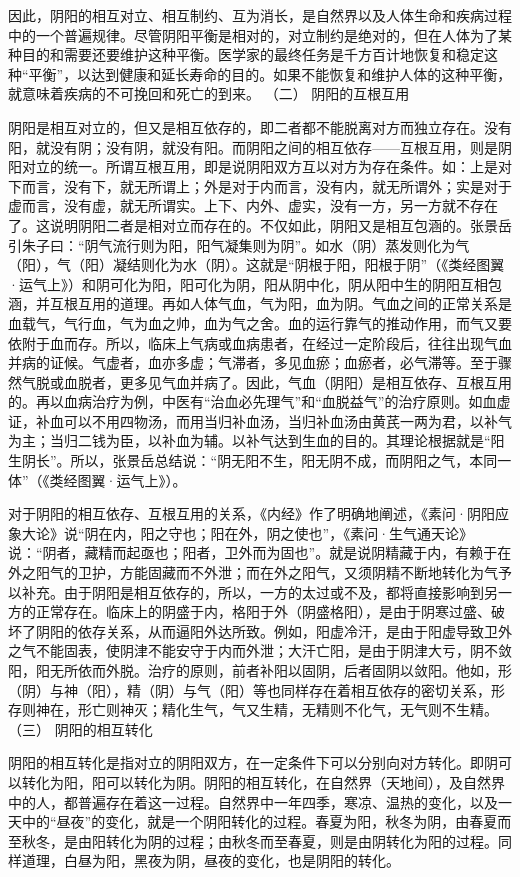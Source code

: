 \documentclass[a4paper,12pt,UTF8,twoside]{ctexbook}
\begin{document}
因此，阴阳的相互对立、相互制约、互为消长，是自然界以及人体生命和疾病过程中的一个普遍规律。尽管阴阳平衡是相对的，对立制约是绝对的，但在人体为了某种目的和需要还要维护这种平衡。医学家的最终任务是千方百计地恢复和稳定这种“平衡”，以达到健康和延长寿命的目的。如果不能恢复和维护人体的这种平衡，就意味着疾病的不可挽回和死亡的到来。
（二） 阴阳的互根互用

阴阳是相互对立的，但又是相互依存的，即二者都不能脱离对方而独立存在。没有阳，就没有阴；没有阴，就没有阳。而阴阳之间的相互依存——互根互用，则是阴阳对立的统一。所谓互根互用，即是说阴阳双方互以对方为存在条件。如：上是对下而言，没有下，就无所谓上；外是对于内而言，没有内，就无所谓外；实是对于虚而言，没有虚，就无所谓实。上下、内外、虚实，没有一方，另一方就不存在了。这说明阴阳二者是相对立而存在的。不仅如此，阴阳又是相互包涵的。张景岳引朱子曰：“阴气流行则为阳，阳气凝集则为阴”。如水（阴）蒸发则化为气（阳），气（阳）凝结则化为水（阴）。这就是“阴根于阳，阳根于阴”（《类经图翼·运气上》）和阴可化为阳，阳可化为阴，阳从阴中化，阴从阳中生的阴阳互相包涵，并互根互用的道理。再如人体气血，气为阳，血为阴。气血之间的正常关系是血载气，气行血，气为血之帅，血为气之舍。血的运行靠气的推动作用，而气又要依附于血而存。所以，临床上气病或血病患者，在经过一定阶段后，往往出现气血并病的证候。气虚者，血亦多虚；气滞者，多见血瘀；血瘀者，必气滞等。至于骤然气脱或血脱者，更多见气血并病了。因此，气血（阴阳）是相互依存、互根互用的。再以血病治疗为例，中医有“治血必先理气”和“血脱益气”的治疗原则。如血虚证，补血可以不用四物汤，而用当归补血汤，当归补血汤由黄芪一两为君，以补气为主；当归二钱为臣，以补血为辅。以补气达到生血的目的。其理论根据就是“阳生阴长”。所以，张景岳总结说：“阴无阳不生，阳无阴不成，而阴阳之气，本同一体”（《类经图翼·运气上》）。

对于阴阳的相互依存、互根互用的关系，《内经》作了明确地阐述，《素问·阴阳应象大论》说“阴在内，阳之守也；阳在外，阴之使也”，《素问·生气通天论》说：“阴者，藏精而起亟也；阳者，卫外而为固也”。就是说阴精藏于内，有赖于在外之阳气的卫护，方能固藏而不外泄；而在外之阳气，又须阴精不断地转化为气予以补充。由于阴阳是相互依存的，所以，一方的太过或不及，都将直接影响到另一方的正常存在。临床上的阴盛于内，格阳于外（阴盛格阳），是由于阴寒过盛、破坏了阴阳的依存关系，从而逼阳外达所致。例如，阳虚冷汗，是由于阳虚导致卫外之气不能固表，使阴津不能安守于内而外泄；大汗亡阳，是由于阴津大亏，阴不敛阳，阳无所依而外脱。治疗的原则，前者补阳以固阴，后者固阴以敛阳。他如，形（阴）与神（阳），精（阴）与气（阳）等也同样存在着相互依存的密切关系，形存则神在，形亡则神灭；精化生气，气又生精，无精则不化气，无气则不生精。
（三） 阴阳的相互转化

阴阳的相互转化是指对立的阴阳双方，在一定条件下可以分别向对方转化。即阴可以转化为阳，阳可以转化为阴。阴阳的相互转化，在自然界（天地间），及自然界中的人，都普遍存在着这一过程。自然界中一年四季，寒凉、温热的变化，以及一天中的“昼夜”的变化，就是一个阴阳转化的过程。春夏为阳，秋冬为阴，由春夏而至秋冬，是由阳转化为阴的过程；由秋冬而至春夏，则是由阴转化为阳的过程。同样道理，白昼为阳，黑夜为阴，昼夜的变化，也是阴阳的转化。
\end{document}
